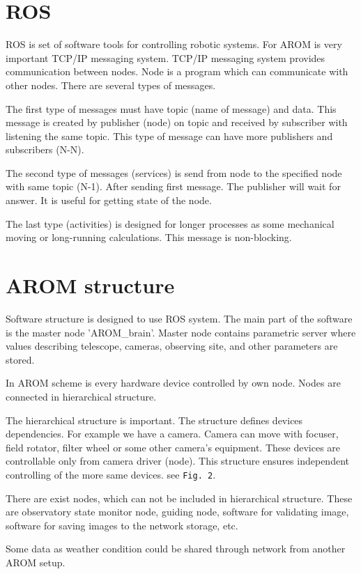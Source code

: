 \documentclass{poster16}
\begin{document}
\section{ROS}
ROS is set of software tools for controlling robotic systems. For AROM is very important TCP/IP messaging system. TCP/IP messaging system provides communication between nodes. Node is a program which can communicate with other nodes. There are several types of messages. 

The first type of messages must have topic (name of message) and data. This message is created by publisher (node) on topic and received by subscriber with listening the same topic. This type of message can have more publishers and subscribers (N-N).

The second type of messages (services) is send from node to the specified node with same topic (N-1). After sending first message. The publisher will wait for answer. It is useful for getting state of the node.

The last type (activities) is designed for longer processes as some mechanical moving or long-running calculations. This message is non-blocking.

\pagebreak
\section{AROM structure}
Software structure is designed to use ROS system. The main part of the software is the master node 'AROM\_brain'. Master node contains parametric server where values describing telescope, cameras, observing site, and other parameters are stored. 

In AROM scheme is every hardware device controlled by own node. Nodes are connected in hierarchical structure.

The hierarchical structure is important. The structure defines devices dependencies. For example we have a camera. Camera can move with focuser, field rotator, filter wheel or some other camera's equipment. These devices are controllable only from camera driver (node). This structure ensures independent controlling of the more same devices. see \texttt{Fig. 2}.
 
There are exist nodes, which can not be included in hierarchical structure. These are observatory state monitor node, guiding node, software for validating image, software for saving images to the network storage, etc.

Some data as weather condition could be shared through network from another AROM setup.
\end{document}
